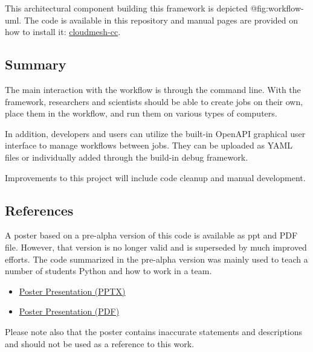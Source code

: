 This architectural component building this framework is depicted
@fig:workflow-uml. The code is available in this repository and manual
pages are provided on how to install it:
\href{https://github.com/cloudmesh/cloudmesh-cc}{cloudmesh-cc}.

\subsection{Summary}\label{summary}

The main interaction with the workflow is through the command line. With
the framework, researchers and scientists should be able to create jobs
on their own, place them in the workflow, and run them on various types
of computers.

In addition, developers and users can utilize the built-in OpenAPI
graphical user interface to manage workflows between jobs. They can be
uploaded as YAML files or individually added through the build-in debug
framework.

Improvements to this project will include code cleanup and manual
development.

\subsection{References}\label{references}

A poster based on a pre-alpha version of this code is available as ppt
and PDF file. However, that version is no longer valid and is superseded
by much improved efforts. The code summarized in the pre-alpha version
was mainly used to teach a number of students Python and how to work in
a team.

\begin{itemize}
\item
  \href{https://github.com/cloudmesh/cloudmesh-cc/raw/main/documents/analytics-service.pptx}{Poster
  Presentation (PPTX)}
\item
  \href{https://github.com/cloudmesh/cloudmesh-cc/raw/main/documents/analytics-service.pdf}{Poster
  Presentation (PDF)}
\end{itemize}

Please note also that the poster contains inaccurate statements and
descriptions and should not be used as a reference to this work.

